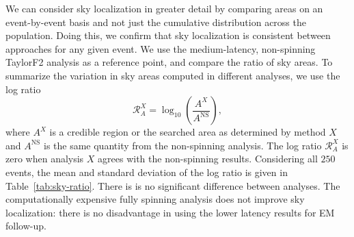 We can consider sky localization in greater detail by comparing areas on an event-by-event basis and not just the cumulative distribution across the population. Doing this, we confirm that sky localization is consistent between approaches for any given event. We use the medium-latency, non-spinning TaylorF2 analysis as a reference point, and compare the ratio of sky areas. To summarize the variation in sky areas computed in different analyses, we use the log ratio
\begin{equation}
\mathcal{R}_A^X = \log_{10}\left(\frac{A^X}{A^\mathrm{NS}}\right),
\end{equation}
where $A^X$ is a credible region or the searched area as determined by method $X$ and $A^\mathrm{NS}$ is the same quantity from the non-spinning analysis. The log ratio $\mathcal{R}_A^X$ is zero when analysis $X$ agrees with the non-spinning results. Considering all $250$ events, the mean and standard deviation of the log ratio is given in Table~\ref{tab:sky-ratio}. There is is no significant difference between analyses. The computationally expensive fully spinning analysis does not improve sky localization: there is no disadvantage in using the lower latency results for EM follow-up.
  
  